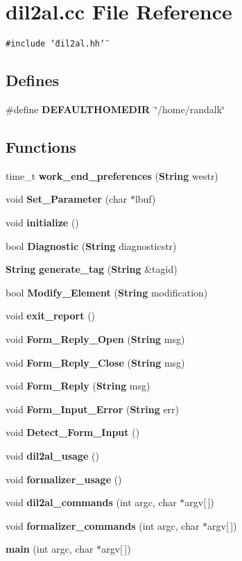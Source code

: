 \section{dil2al.cc File Reference}
\label{dil2al_8cc}
{\tt \#include \char`\"{}dil2al.hh\char`\"{}}\par
\subsection*{Defines}
\begin{CompactItemize}
\item 
\#define {\bf DEFAULTHOMEDIR}\ \char`\"{}/home/randalk\char`\"{}
\end{CompactItemize}
\subsection*{Functions}
\begin{CompactItemize}
\item 
time\_\-t {\bf work\_\-end\_\-preferences} ({\bf String} westr)
\item 
void {\bf Set\_\-Parameter} (char $\ast$lbuf)
\item 
void {\bf initialize} ()
\item 
bool {\bf Diagnostic} ({\bf String} diagnosticstr)
\item 
{\bf String} {\bf generate\_\-tag} ({\bf String} \&tagid)
\item 
bool {\bf Modify\_\-Element} ({\bf String} modification)
\item 
void {\bf exit\_\-report} ()
\item 
void {\bf Form\_\-Reply\_\-Open} ({\bf String} msg)
\item 
void {\bf Form\_\-Reply\_\-Close} ({\bf String} msg)
\item 
void {\bf Form\_\-Reply} ({\bf String} msg)
\item 
void {\bf Form\_\-Input\_\-Error} ({\bf String} err)
\item 
void {\bf Detect\_\-Form\_\-Input} ()
\item 
void {\bf dil2al\_\-usage} ()
\item 
void {\bf formalizer\_\-usage} ()
\item 
void {\bf dil2al\_\-commands} (int argc, char $\ast$argv[$\,$])
\item 
void {\bf formalizer\_\-commands} (int argc, char $\ast$argv[$\,$])
\item 
{\bf main} (int argc, char $\ast$argv[$\,$])
\end{CompactItemize}

